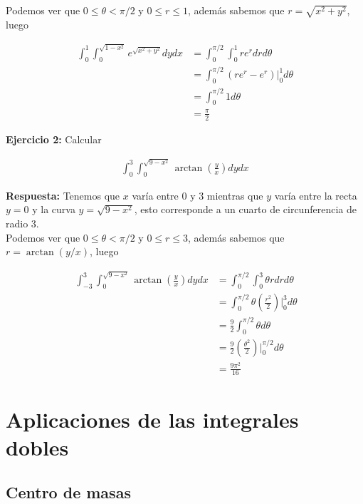 \documentclass{article}
\theoremstyle{definition}
\begin{document}
Podemos ver que $0 \leq \theta < \pi/2$ y $0 \leq r \leq 1$, adem\'as sabemos que $r=\sqrt{x^2+y^2}$, luego


\begin{align*}
    \int_0^1 \int_0^{\sqrt{1-x^2}} e^{\sqrt{x^2+y^2}}dydx &= 
    \int_0^{\pi/2}\int_0^1 re^r dr d\theta \\
    &= \int_0^{\pi/2} (re^r-e^r)\bigg|_0^1 d\theta \\
    &= \int_0^{\pi/2} 1 d\theta \\
    &= \frac{\pi}{2}
\end{align*}



\textbf{Ejercicio 2:} Calcular 

\begin{align*}
    \int_{0}^3 \int_0^{\sqrt{9-x^2}} \arctan\left( \frac{y}{x}\right)dydx
\end{align*}

\textbf{Respuesta:} Tenemos que $x$ var\'ia entre 0 y 3 mientras que $y$ var\'ia entre la recta $y=0$ y la curva $y= \sqrt{9-x^2}$, esto corresponde a un cuarto de circunferencia de radio 3. \\



Podemos ver que $0 \leq \theta < \pi/2$ y $0 \leq r \leq 3$, adem\'as sabemos que $r=\arctan(y/x)$, luego


\begin{align*}
    \ \int_{-3}^3 \int_0^{\sqrt{9-x^2}} \arctan\left( \frac{y}{x}\right)dydx &= 
    \int_0^{\pi/2}\int_0^3 \theta r dr d\theta \\
    &= \int_0^{\pi/2} \theta \left( \frac{r^2}{2}\right)\bigg|_0^3 d\theta \\
    &= \frac{9}{2}\int_0^{\pi/2} \theta d\theta \\
    &= \frac{9}{2}\left( \frac{\theta^2}{2}\right)\bigg|_0^{\pi/2} d\theta \\
    &= \frac{9\pi^2}{16}
\end{align*}

\newpage

\section{Aplicaciones de las integrales dobles}

\subsection{Centro de masas}
\end{document}
